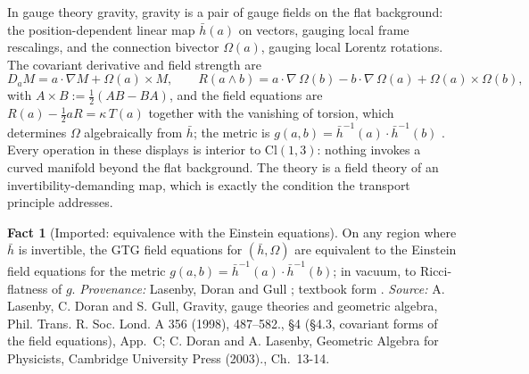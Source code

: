 \documentclass[11pt]{article}
\theoremstyle{definition}
\newtheorem{fact}[theorem]{Fact}
\theoremstyle{plain}
\providecommand{\Cl}{}\renewcommand{\Cl}{\mathrm{Cl}}
\providecommand{\hb}{}\renewcommand{\hb}{\bar{h}}
\begin{document}
In gauge theory gravity, gravity is a pair of gauge fields on the flat background: the position-dependent linear map $\hb(a)$ on vectors, gauging local frame rescalings, and the connection bivector $\Omega(a)$, gauging local Lorentz rotations. The covariant derivative and field strength are
\[
D_a M = a \cdot \nabla M + \Omega(a) \times M, \qquad
R(a \wedge b) = a\cdot\nabla\,\Omega(b) - b\cdot\nabla\,\Omega(a) + \Omega(a) \times \Omega(b),
\]
with $A \times B := \tfrac12(AB - BA)$, and the field equations are $R(a) - \tfrac12 a R = \kappa\, T(a)$ together with the vanishing of torsion, which determines $\Omega$ algebraically from $\hb$; the metric is $g(a,b) = \hb^{-1}(a) \cdot \hb^{-1}(b)$ \cite{LDG1998}. Every operation in these displays is interior to $\Cl(1,3)$: nothing invokes a curved manifold beyond the flat background. The theory is a field theory of an invertibility-demanding map, which is exactly the condition the transport principle addresses.

\begin{fact}[Imported: equivalence with the Einstein equations]\label{c:interior.imported-equivalence-einstein-equations}
On any region where $\hb$ is invertible, the GTG field equations for $(\hb, \Omega)$ are equivalent to the Einstein field equations for the metric $g(a,b) = \hb^{-1}(a)\cdot\hb^{-1}(b)$; in vacuum, to Ricci-flatness of $g$. \emph{Provenance:} Lasenby, Doran and Gull \cite[\S 4.3 and App.~C]{LDG1998}; textbook form \cite[Ch.~13-14]{DoranLasenby2003}.
\emph{Source:} A. Lasenby, C. Doran and S. Gull, Gravity, gauge theories and geometric algebra, Phil. Trans. R. Soc. Lond. A 356 (1998), 487--582., \S 4 (\S 4.3, covariant forms of the field equations), App.~C; C. Doran and A. Lasenby, Geometric Algebra for Physicists, Cambridge University Press (2003)., Ch.~13-14.
\end{fact}
\end{document}
